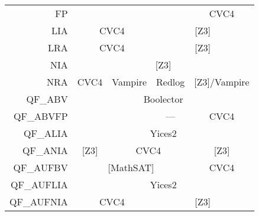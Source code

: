 \begin{table}
{\begin{tabular}{|rcccc|}
FP                               & \multicolumn{1}{l}{}          & \multicolumn{1}{l}{}                & \multicolumn{1}{l|}{}         & \multicolumn{1}{c|}{CVC4}             \\ \cline{2-5}
\multicolumn{1}{|r|}{LIA}        & \multicolumn{2}{c|}{CVC4}                                           & \multicolumn{2}{c|}{{[}Z3{]}}                                         \\ \cline{2-5}
\multicolumn{1}{|r|}{LRA}        & \multicolumn{2}{c|}{CVC4}                                           & \multicolumn{2}{c|}{{[}Z3{]}}                                         \\ \cline{2-5}
\multicolumn{1}{|r|}{NIA}        & \multicolumn{4}{c|}{{[}Z3{]}}                                                                                                               \\ \cline{2-5}
\multicolumn{1}{|r|}{NRA}        & \multicolumn{1}{c|}{CVC4}     & \multicolumn{1}{c|}{Vampire}        & \multicolumn{1}{c|}{Redlog}   & \multicolumn{1}{c|}{{[}Z3{]}/Vampire} \\ \cline{2-5}
\multicolumn{1}{|r|}{QF\_ABV}    & \multicolumn{4}{c|}{Boolector}                                                                                                              \\ \cline{2-5}
QF\_ABVFP                        & \multicolumn{1}{l}{}          & \multicolumn{1}{l}{}                & \multicolumn{1}{|c|}{---}     & \multicolumn{1}{c|}{CVC4}             \\ \cline{2-5}
\multicolumn{1}{|r|}{QF\_ALIA}   & \multicolumn{4}{c|}{Yices2}                                                                                                                 \\ \cline{2-5}
\multicolumn{1}{|r|}{QF\_ANIA}   & \multicolumn{1}{c|}{{[}Z3{]}} & \multicolumn{2}{c|}{CVC4}                                           & \multicolumn{1}{c|}{{[}Z3{]}}         \\ \cline{2-5}
\multicolumn{1}{|r|}{QF\_AUFBV}  & \multicolumn{3}{c|}{{[}MathSAT{]}}                                                                  & \multicolumn{1}{c|}{CVC4}             \\ \cline{2-5}
\multicolumn{1}{|r|}{QF\_AUFLIA} & \multicolumn{4}{c|}{Yices2}                                                                                                                 \\ \cline{2-5}
\multicolumn{1}{|r|}{QF\_AUFNIA} & \multicolumn{2}{c|}{CVC4}                                           & \multicolumn{2}{c|}{{[}Z3{]}}                                         \\ \cline{2-5}

\end{tabular}}
\end{table}
